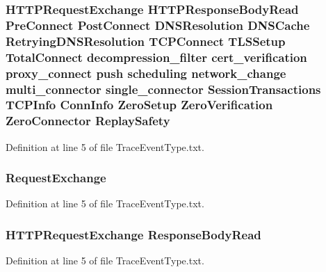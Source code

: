 \subsubsection[{Replay\+Safety}]{ H\+T\+T\+P\+Request\+Exchange H\+T\+T\+P\+Response\+Body\+Read {\bf Pre\+Connect} {\bf Post\+Connect} D\+N\+S\+Resolution D\+N\+S\+Cache Retrying\+D\+N\+S\+Resolution T\+C\+P\+Connect T\+L\+S\+Setup {\bf Total\+Connect} decompression\+\_\+filter cert\+\_\+verification proxy\+\_\+connect push scheduling network\+\_\+change multi\+\_\+connector single\+\_\+connector {\bf Session\+Transactions} {\bf T\+C\+P\+Info} {\bf Conn\+Info} {\bf Zero\+Setup} {\bf Zero\+Verification} {\bf Zero\+Connector} Replay\+Safety}\label{TraceEventType_8txt_adcf5279d711d79e3ae6d8657d36a6338}


Definition at line 5 of file Trace\+Event\+Type.\+txt.

\subsubsection[{Request\+Exchange}]{ Request\+Exchange}\label{TraceEventType_8txt_adbc0b652911164f14ddbed35f16811fd}


Definition at line 5 of file Trace\+Event\+Type.\+txt.

\subsubsection[{Response\+Body\+Read}]{ H\+T\+T\+P\+Request\+Exchange Response\+Body\+Read}\label{TraceEventType_8txt_a07903c164b7e03643671e8fea0b9c700}


Definition at line 5 of file Trace\+Event\+Type.\+txt.

